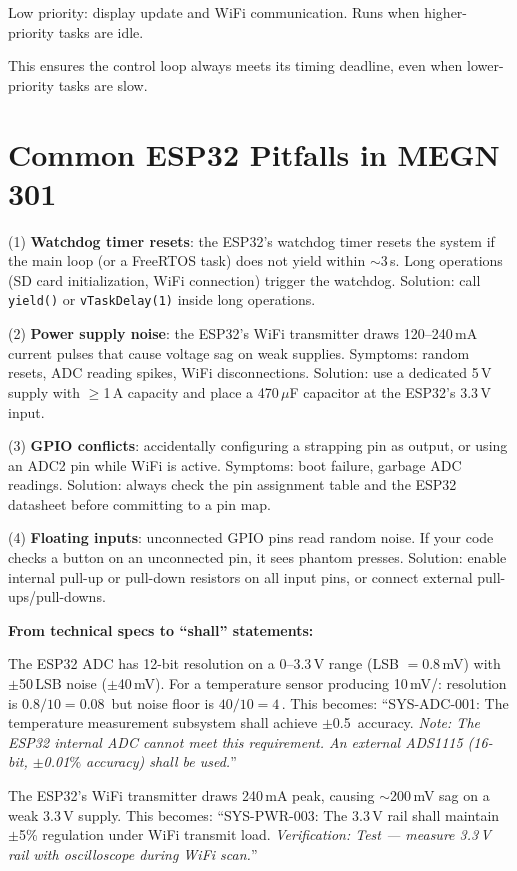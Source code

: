 Low priority: display update and WiFi communication. Runs when higher-priority tasks are idle.

This ensures the control loop always meets its timing deadline, even when lower-priority tasks are slow.

\section{Common ESP32 Pitfalls in MEGN 301}
(1) \textbf{Watchdog timer resets}: the ESP32's watchdog timer resets the system if the main loop (or a FreeRTOS task) does not yield within $\sim$3\,s. Long operations (SD card initialization, WiFi connection) trigger the watchdog. Solution: call \texttt{yield()} or \texttt{vTaskDelay(1)} inside long operations.

(2) \textbf{Power supply noise}: the ESP32's WiFi transmitter draws 120--240\,mA current pulses that cause voltage sag on weak supplies. Symptoms: random resets, ADC reading spikes, WiFi disconnections. Solution: use a dedicated 5\,V supply with $\geq$1\,A capacity and place a 470\,$\mu$F capacitor at the ESP32's 3.3\,V input.

(3) \textbf{GPIO conflicts}: accidentally configuring a strapping pin as output, or using an ADC2 pin while WiFi is active. Symptoms: boot failure, garbage ADC readings. Solution: always check the pin assignment table and the ESP32 datasheet before committing to a pin map.

(4) \textbf{Floating inputs}: unconnected GPIO pins read random noise. If your code checks a button on an unconnected pin, it sees phantom presses. Solution: enable internal pull-up or pull-down resistors on all input pins, or connect external pull-ups/pull-downs.
\begin{keyconceptbox}
\textbf{From technical specs to ``shall'' statements:}

The ESP32 ADC has 12-bit resolution on a 0--3.3\,V range (LSB $= 0.8$\,mV) with $\pm$50\,LSB noise ($\pm$40\,mV). For a temperature sensor producing 10\,mV/\degC{}: resolution is $0.8/10 = 0.08$\,\degC{} but noise floor is $40/10 = 4$\,\degC{}. This becomes: ``SYS-ADC-001: The temperature measurement subsystem shall achieve $\pm$0.5\,\degC{} accuracy. \emph{Note: The ESP32 internal ADC cannot meet this requirement. An external ADS1115 (16-bit, $\pm$0.01$\%$ accuracy) shall be used.}''

The ESP32's WiFi transmitter draws 240\,mA peak, causing $\sim$200\,mV sag on a weak 3.3\,V supply. This becomes: ``SYS-PWR-003: The 3.3\,V rail shall maintain $\pm$5\% regulation under WiFi transmit load. \emph{Verification: Test --- measure 3.3\,V rail with oscilloscope during WiFi scan.}''
\end{keyconceptbox}
